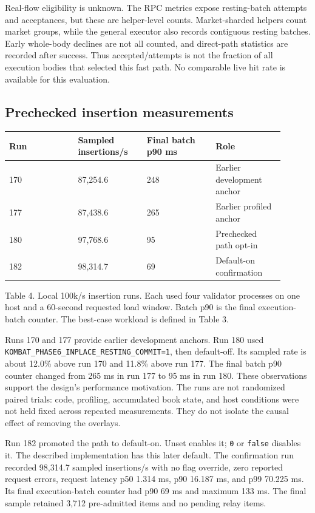 \documentclass[11pt]{article}
\begin{document}
Real-flow eligibility is unknown. The RPC metrics expose resting-batch attempts and acceptances, but these are helper-level counts. Market-sharded helpers count market groups, while the general executor also records contiguous resting batches. Early whole-body declines are not all counted, and direct-path statistics are recorded after success. Thus accepted/attempts is not the fraction of all execution bodies that selected this fast path. No comparable live hit rate is available for this evaluation. \cite{R29}

\subsection{Prechecked insertion measurements}
{\small\begin{longtable}{@{}p{0.225\linewidth}p{0.225\linewidth}p{0.225\linewidth}p{0.225\linewidth}@{}}
\toprule
Run & Sampled insertions/s & Final batch p90 ms & Role \\
\midrule
\endhead
170 & 87,254.6 & 248 & Earlier development anchor \\
177 & 87,438.6 & 265 & Earlier profiled anchor \\
180 & 97,768.6 & 95 & Prechecked path opt-in \\
182 & 98,314.7 & 69 & Default-on confirmation \\
\bottomrule
\end{longtable}}
Table 4. Local 100k/s insertion runs. Each used four validator processes on one host and a 60-second requested load window. Batch p90 is the final execution-batch counter. The best-case workload is defined in Table 3. \cite{R13}

Runs 170 and 177 provide earlier development anchors. Run 180 used \texttt{KOMBAT\_\allowbreak PHASE6\_\allowbreak INPLACE\_\allowbreak RESTING\_\allowbreak COMMIT=1}, then default-off. Its sampled rate is about 12.0\% above run 170 and 11.8\% above run 177. The final batch p90 counter changed from 265 ms in run 177 to 95 ms in run 180. These observations support the design's performance motivation. The runs are not randomized paired trials: code, profiling, accumulated book state, and host conditions were not held fixed across repeated measurements. They do not isolate the causal effect of removing the overlays. \cite{R13}

Run 182 promoted the path to default-on. Unset enables it; \texttt{0} or \texttt{false} disables it. The described implementation has this later default. The confirmation run recorded 98,314.7 sampled insertions/s with no flag override, zero reported request errors, request latency p50 1.314 ms, p90 16.187 ms, and p99 70.225 ms. Its final execution-batch counter had p90 69 ms and maximum 133 ms. The final sample retained 3,712 pre-admitted items and no pending relay items. \cite{R13}
\end{document}
